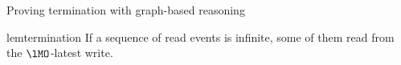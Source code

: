 \begin{frame}{Proving termination with graph-based reasoning}
  \vspace{-0.5cm}
  \begin{center}
    

    \pause 
    \begin{restatable}{lem}{termination}
      If a sequence of read events is infinite, some of them read from the $\lMO$-latest write.
    \end{restatable}

  \end{center}

  \vspace{-1cm}
  
\end{frame}
